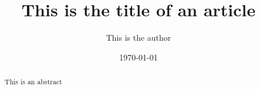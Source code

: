 \documentclass{article}         %
\title{This is the title of an article}
\author{This is the author}
\date{\today}
\begin{document}
\maketitle

\begin{abstract}
This is an abstract
\end{abstract}


\clearpage
\printglossaries




\end{document}
